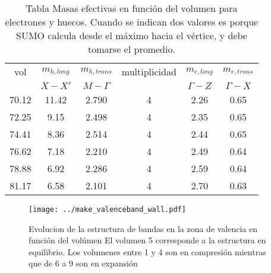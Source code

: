 \begin{table}
  \caption{
    \protect\label{TableEffMassVol} Tabla Masas efectivas en función del volumen para electrones 
    y huecos. Cuando se indican dos valores es porque SUMO calcula desde el máximo hacia 
    el vértice, y debe tomarse el promedio.
  }

    \small
    \centering
  \begin{tabular*}{0.8\textwidth}{c|c|c|c|c|c}
    \hline
vol&$m_{h, long}$ &$m_{h, trans}$ &multiplicidad& $m_{e,long}$ &$m_{e,trans}$ \\
       &$X - X'$&  $M - \Gamma$ &    &$\Gamma - Z$ &$\Gamma -  X$\\
     \hline
70.12  & 11.42       & 2.790  &  4  &   2.26   & 0.65 \\
72.25  & 9.15        & 2.498  &  4  &   2.35   & 0.65 \\ 
74.41  & 8.36        & 2.514  &  4  &   2.44   & 0.65 \\ 
76.62  & 7.18        & 2.210  &  4  &   2.49   & 0.64 \\
78.88  & 6.92        & 2.286  &  4  &   2.59   & 0.64 \\
81.17  & 6.58        & 2.101  &  4  &   2.70   & 0.63 \\
\hline
  \end{tabular*}
\end{table}

\begin{figure}

  \texttt{[image: ../make\_valenceband\_wall.pdf]}
  \caption{\label{FigureStructureBandWall} Evolucion de la estructura de bandas
  en la zona de valencia en función del volúmen El volumen 5 corresponde a 
  la estructura en equilibrio. Los volumenes entre 1 y 4 son en compresión 
  mientras que de 6 a 9 son en expansión}
\end{figure}



